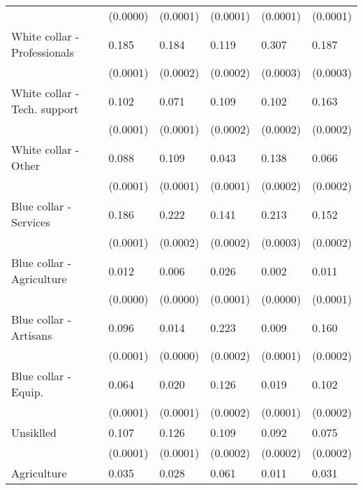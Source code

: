 \begin{tabular}{llllll}
                             &  (0.0000) &  (0.0001) &  (0.0001) &           (0.0001) &         (0.0001) \\
White collar - Professionals &     0.185 &     0.184 &     0.119 &              0.307 &            0.187 \\
                             &  (0.0001) &  (0.0002) &  (0.0002) &           (0.0003) &         (0.0003) \\
White collar - Tech. support &     0.102 &     0.071 &     0.109 &              0.102 &            0.163 \\
                             &  (0.0001) &  (0.0001) &  (0.0002) &           (0.0002) &         (0.0002) \\
White collar - Other         &     0.088 &     0.109 &     0.043 &              0.138 &            0.066 \\
                             &  (0.0001) &  (0.0001) &  (0.0001) &           (0.0002) &         (0.0002) \\
Blue collar - Services       &     0.186 &     0.222 &     0.141 &              0.213 &            0.152 \\
                             &  (0.0001) &  (0.0002) &  (0.0002) &           (0.0003) &         (0.0002) \\
Blue collar - Agriculture    &     0.012 &     0.006 &     0.026 &              0.002 &            0.011 \\
                             &  (0.0000) &  (0.0000) &  (0.0001) &           (0.0000) &         (0.0001) \\
Blue collar - Artisans       &     0.096 &     0.014 &     0.223 &              0.009 &            0.160 \\
                             &  (0.0001) &  (0.0000) &  (0.0002) &           (0.0001) &         (0.0002) \\
Blue collar - Equip.         &     0.064 &     0.020 &     0.126 &              0.019 &            0.102 \\
                             &  (0.0001) &  (0.0001) &  (0.0002) &           (0.0001) &         (0.0002) \\
Unsiklled                    &     0.107 &     0.126 &     0.109 &              0.092 &            0.075 \\
                             &  (0.0001) &  (0.0001) &  (0.0002) &           (0.0002) &         (0.0002) \\
Agriculture                  &     0.035 &     0.028 &     0.061 &              0.011 &            0.031 \\

\end{tabular}
